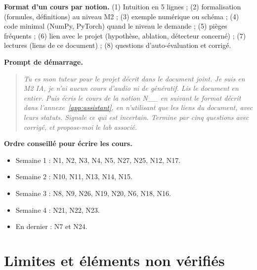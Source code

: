 \documentclass[11pt,a4paper]{article}
\begin{document}
\textbf{Format d'un cours par notion.} (1) Intuition en 5 lignes ; (2) formalisation (formules, définitions) au niveau M2 ; (3) exemple numérique ou schéma ; (4) code minimal (NumPy, PyTorch) quand le niveau le demande ; (5) pièges fréquents ; (6) lien avec le projet (hypothèse, ablation, détecteur concerné) ; (7) lectures (liens de ce document) ; (8) questions d'auto-évaluation et corrigé.

\textbf{Prompt de démarrage.}
\begin{quote}
\emph{Tu es mon tuteur pour le projet décrit dans le document joint. Je suis en M2 IA, je n'ai aucun cours d'audio ni de génératif. Lis le document en entier. Puis écris le cours de la notion N\_\_ en suivant le format décrit dans l'annexe~\ref{app:assistant}, en n'utilisant que les liens du document, avec leurs statuts. Signale ce qui est incertain. Termine par cinq questions avec corrigé, et propose-moi le lab associé.}
\end{quote}

\textbf{Ordre conseillé pour écrire les cours.}
\begin{itemize}
  \item Semaine 1 : N1, N2, N3, N4, N5, N27, N25, N12, N17.
  \item Semaine 2 : N10, N11, N13, N14, N15.
  \item Semaine 3 : N8, N9, N26, N19, N20, N6, N18, N16.
  \item Semaine 4 : N21, N22, N23.
  \item En dernier : N7 et N24.
\end{itemize}

\section{Limites et éléments non vérifiés}
\label{app:limites}
\end{document}
